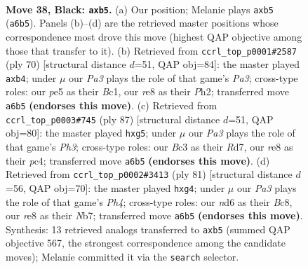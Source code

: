 \documentclass[11pt]{article}
\begin{document}
\clearpage

\begin{figure}[p]\centering
\begin{subfigure}{0.46\textwidth}\centering
\resizebox{\linewidth}{!}{%
\newchessgame
\chessboard[
  setfen={4R3/5pk1/p1pNb3/PP2P1p1/8/2b5/8/5K2 b - - 0 38},
  showmover=false,
  pgfstyle=straightmove, color=movearrow, markmove={a6-b5}
]}
\caption{}
\end{subfigure}\hfill
\begin{subfigure}{0.46\textwidth}\centering
\resizebox{\linewidth}{!}{%
\newchessgame
\chessboard[
  setfen={1r6/p7/3kpb1p/8/1pR5/P1P5/4K2P/2B5 w - - 0 36},
  showmover=false,
  pgfstyle=straightmove, color=movearrow, markmove={a3-b4}
]}
\caption{}
\end{subfigure}
\\[4pt]
\begin{subfigure}{0.46\textwidth}\centering
\resizebox{\linewidth}{!}{%
\newchessgame
\chessboard[
  setfen={2k5/p2r4/2N2p1p/1Pb1p1P1/2P3P1/2K5/4R3/8 b - - 0 44},
  showmover=false,
  pgfstyle=straightmove, color=movearrow, markmove={h6-g5}
]}
\caption{}
\end{subfigure}\hfill
\begin{subfigure}{0.46\textwidth}\centering
\resizebox{\linewidth}{!}{%
\newchessgame
\chessboard[
  setfen={2b5/1n6/8/p2Pbpkp/6P1/4K3/R1B1N1P1/8 b - - 0 41},
  showmover=false,
  pgfstyle=straightmove, color=movearrow, markmove={h5-g4}
]}
\caption{}
\end{subfigure}
\caption{\textbf{Move 38, Black: \texttt{axb5}.} (a) Our position; Melanie plays \texttt{axb5} (\texttt{a6b5}). Panels (b)--(d) are the retrieved master positions whose correspondence most drove this move (highest QAP objective among those that transfer to it). (b) Retrieved from \texttt{ccrl\_top\_p0001\#2587} (ply 70) [structural distance $d$=51, QAP obj=84]: the master played \texttt{axb4}; under $\mu$ our \emph{Pa3} plays the role of that game's \emph{Pa3}; cross-type roles: our \emph{p}e5 as their \emph{B}c1, our \emph{r}e8 as their \emph{P}h2; transferred move \texttt{a6b5} \textbf{(endorses this move)}. (c) Retrieved from \texttt{ccrl\_top\_p0003\#745} (ply 87) [structural distance $d$=51, QAP obj=80]: the master played \texttt{hxg5}; under $\mu$ our \emph{Pa3} plays the role of that game's \emph{Ph3}; cross-type roles: our \emph{B}c3 as their \emph{R}d7, our \emph{r}e8 as their \emph{p}c4; transferred move \texttt{a6b5} \textbf{(endorses this move)}. (d) Retrieved from \texttt{ccrl\_top\_p0002\#3413} (ply 81) [structural distance $d$=56, QAP obj=70]: the master played \texttt{hxg4}; under $\mu$ our \emph{Pa3} plays the role of that game's \emph{Ph4}; cross-type roles: our \emph{n}d6 as their \emph{B}c8, our \emph{r}e8 as their \emph{N}b7; transferred move \texttt{a6b5} \textbf{(endorses this move)}. Synthesis: 13 retrieved analogs transferred to \texttt{axb5} (summed QAP objective 567, the strongest correspondence among the candidate moves); Melanie committed it via the \texttt{search} selector.}
\label{fig:thought-m75}
\end{figure}
\end{document}
